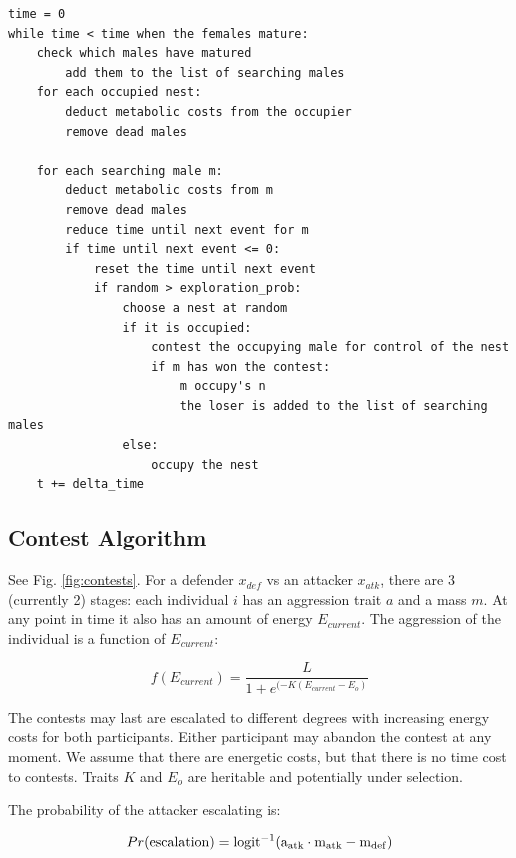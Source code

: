 \documentclass[a4paper,11pt]{article}
\begin{document}
\begin{verbatim}
time = 0
while time < time when the females mature:
    check which males have matured
        add them to the list of searching males
    for each occupied nest:
        deduct metabolic costs from the occupier
        remove dead males

    for each searching male m:
        deduct metabolic costs from m
        remove dead males
        reduce time until next event for m
        if time until next event <= 0:
            reset the time until next event
            if random > exploration_prob:
                choose a nest at random
                if it is occupied:
                    contest the occupying male for control of the nest
                    if m has won the contest:
                        m occupy's n
                        the loser is added to the list of searching males
                else:
                    occupy the nest
    t += delta_time
\end{verbatim}


\clearpage
\subsection{Contest Algorithm}
See Fig. \ref{fig:contests}.
For a defender $x_{def}$ vs an attacker $x_{atk}$, there are 3 (currently 2) stages:
each individual $i$ has an aggression trait $a$ and a mass $m$. At any point in time it also has an amount of energy $E_{current}$.  
The aggression of the individual is a function of $E_{current}$:



\begin{equation}\label{eq:aggresstion}
f(E_{current})=\frac{L}{1+e^{(-K(E_{current}-E_{o})}}
\end{equation}

The contests may last are escalated to different degrees with increasing energy costs for both participants.  Either participant may abandon the contest at any moment.  We assume that there are energetic costs, but that there is no time cost to contests.  Traits $K$ and $E_{o}$ are heritable and potentially under selection.  

The probability of the attacker escalating is:

\begin{equation}\label{eq:attacker_escalating}
Pr(\rm{escalation}) =  logit^{-1}(a_{atk} \cdot m_{atk} - m_{def})
\end{equation}
\end{document}
